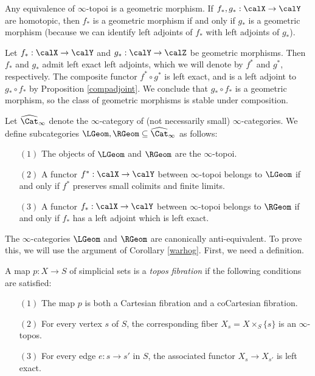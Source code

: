 \begin{remark}
Any equivalence of $\infty$-topoi is a geometric morphism. If $f_{\ast}, g_{\ast}: \calX \rightarrow \calY$ are homotopic, then $f_{\ast}$ is a geometric morphism if and only if $g_{\ast}$ is a geometric morphism (because we can identify left adjoints of $f_{\ast}$ with left adjoints of $g_{\ast}$). 
\end{remark}

\begin{remark}
Let $f_{\ast}: \calX \rightarrow \calY$ and $g_{\ast}: \calY \rightarrow \calZ$ be geometric morphisms. Then $f_{\ast}$ and $g_{\ast}$ admit left exact left adjoints, which we will denote by
$f^{\ast}$ and $g^{\ast}$, respectively. The composite functor $f^{\ast} \circ g^{\ast}$ is left
exact, and is a left adjoint to $g_{\ast} \circ f_{\ast}$ by Proposition \ref{compadjoint}. We conclude that $g_{\ast} \circ f_{\ast}$ is a geometric morphism, so the class of geometric morphisms is stable under composition.
\end{remark}

\begin{definition}
Let $\widehat{\Cat}_{\infty}$ denote the $\infty$-category of (not necessarily small) $\infty$-categories. We define subcategories $\LGeom, \RGeom \subseteq \widehat{\Cat}_{\infty}$ as follows:
\begin{itemize}
\item[$(1)$] The objects of $\LGeom$ and $\RGeom$ are the $\infty$-topoi.
\item[$(2)$] A functor $f^{\ast}: \calX \rightarrow \calY$ between $\infty$-topoi belongs to
$\LGeom$ if and only if $f^{\ast}$ preserves small colimits and finite limits.
\item[$(3)$] A functor $f_{\ast}: \calX \rightarrow \calY$ between $\infty$-topoi belongs to
$\RGeom$ if and only if $f_{\ast}$ has a left adjoint which is left exact.
\end{itemize}
\end{definition}

The $\infty$-categories $\LGeom$ and $\RGeom$ are canonically anti-equivalent. To prove this, we will use the argument of Corollary \ref{warhog}. First, we need a definition.

\begin{definition}\label{skuzz}
A map $p: X \rightarrow S$ of simplicial sets is a {\it topos fibration} if the following conditions are satisfied:
\begin{itemize}
\item[$(1)$] The map $p$ is both a Cartesian fibration and a coCartesian fibration.
\item[$(2)$] For every vertex $s$ of $S$, the corresponding fiber $X_{s} = X \times_{S} \{s\}$ is an $\infty$-topos.
\item[$(3)$] For every edge $e: s \rightarrow s'$ in $S$, the associated functor
$X_{s} \rightarrow X_{s'}$ is left exact.
\end{itemize}
\end{definition}

